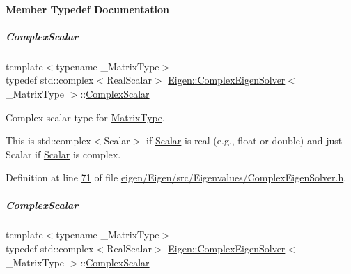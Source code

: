 \paragraph{Member Typedef Documentation}
\mbox{\label{group___eigenvalues___module_a3604c99a69fac3bee42c88cb2b589143}} 
\subparagraph{\texorpdfstring{Complex\+Scalar}{ComplexScalar}\hspace{0.1cm}{\footnotesize\ttfamily [1/2]}}
{\footnotesize\ttfamily template$<$typename \+\_\+\+Matrix\+Type$>$ \\
typedef std\+::complex$<$Real\+Scalar$>$ \hyperlink{group___eigenvalues___module_class_eigen_1_1_complex_eigen_solver}{Eigen\+::\+Complex\+Eigen\+Solver}$<$ \+\_\+\+Matrix\+Type $>$\+::\hyperlink{group___eigenvalues___module_a3604c99a69fac3bee42c88cb2b589143}{Complex\+Scalar}}



Complex scalar type for \hyperlink{group___eigenvalues___module_ad61f6278843a601096276c9a72c0252f}{Matrix\+Type}. 

This is {\ttfamily std\+::complex$<$\+Scalar$>$} if \hyperlink{group___eigenvalues___module_a61035d40c9498bb1d47628cdd4946785}{Scalar} is real (e.\+g., {\ttfamily float} or {\ttfamily double}) and just {\ttfamily Scalar} if \hyperlink{group___eigenvalues___module_a61035d40c9498bb1d47628cdd4946785}{Scalar} is complex. 

Definition at line \hyperlink{eigen_2_eigen_2src_2_eigenvalues_2_complex_eigen_solver_8h_source_l00071}{71} of file \hyperlink{eigen_2_eigen_2src_2_eigenvalues_2_complex_eigen_solver_8h_source}{eigen/\+Eigen/src/\+Eigenvalues/\+Complex\+Eigen\+Solver.\+h}.

\mbox{\label{group___eigenvalues___module_a3604c99a69fac3bee42c88cb2b589143}} 
\subparagraph{\texorpdfstring{Complex\+Scalar}{ComplexScalar}\hspace{0.1cm}{\footnotesize\ttfamily [2/2]}}
{\footnotesize\ttfamily template$<$typename \+\_\+\+Matrix\+Type$>$ \\
typedef std\+::complex$<$Real\+Scalar$>$ \hyperlink{group___eigenvalues___module_class_eigen_1_1_complex_eigen_solver}{Eigen\+::\+Complex\+Eigen\+Solver}$<$ \+\_\+\+Matrix\+Type $>$\+::\hyperlink{group___eigenvalues___module_a3604c99a69fac3bee42c88cb2b589143}{Complex\+Scalar}}



